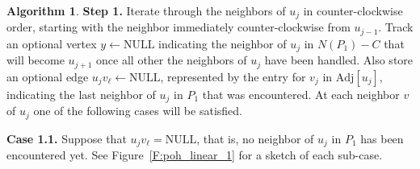 \documentclass[12pt,letterpaper]{article}
\theoremstyle{plain}
\theoremstyle{definition}
\theoremstyle{break}
\newtheorem{algorithm}[lemma]{Algorithm}     %
\begin{document}
\begin{algorithm}
\textbf{Step 1.} Iterate through the neighbors of $u_j$ in counter-clockwise
order, starting with
the neighbor immediately counter-clockwise from $u_{j-1}$.
Track an optional vertex $y\leftarrow\text{NULL}$ indicating
the neighbor of $u_j$ in $N(P_1)-C$ that will become
$u_{j+1}$ once all other the neighbors of $u_j$ have been handled. Also store
an optional edge $u_jv_\ell\leftarrow\text{NULL}$, represented by the entry
for $v_j$ in $\text{Adj}[u_j]$, indicating the last neighbor of $u_j$ in $P_1$
that was encountered. At each neighbor $v$ of $u_j$ one of the following cases
will be satisfied.

\textbf{Case 1.1.} Suppose that $u_jv_\ell=\text{NULL}$,
that is, no neighbor of $u_j$ in $P_1$ has been encountered yet.
See Figure~\ref{F:poh_linear_1} for a sketch of each sub-case.

\begin{figure}[ht]
\begin{center}
\end{center}
\end{figure}
\end{algorithm}
\end{document}
